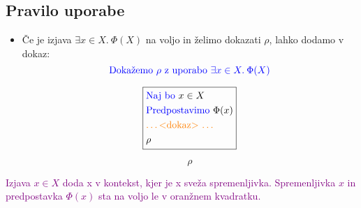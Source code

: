 \documentclass[12pt,a4paper]{article}
\newcommand{\blue}[1]{\textcolor{blue}{#1}}
\newcommand{\orange}[1]{\textcolor{orange}{#1}}
\newcommand{\purple}[1]{\textcolor{purple}{#1}}
\newcommand{\dokaz}{\orange{\text{\ldots <dokaz> \ldots}}}
\newcommand{\skatlica}[1]{
    \begin{equation*}
        \boxed{
        \begin{aligned}
            #1
        \end{aligned}
        }
    \end{equation*}
}
\begin{document}
    \subsection*{Pravilo uporabe}
    \begin{itemize}
        \item Če je izjava $ \exists x \in X. \: \Phi (X) $ na voljo in želimo dokazati $ \rho $, lahko dodamo v dokaz:
        $$ \blue{\text{Dokažemo } \rho \text{ z uporabo } \exists x \in X. \: \Phi (X) } $$
        \skatlica{
            &\blue{\text{Naj bo }} x \in X \\
            &\blue{\text{Predpostavimo }} \Phi ( x ) \\ 
            &\dokaz \\ 
            &\rho
        }
        $$ \rho $$
    \end{itemize}
    \purple{
        Izjava $x \in X $ doda x v kontekst, kjer je x sveža spremenljivka. 
        Spremenljivka $x$ in predpostavka $ \Phi (x) $ sta na voljo le v oranžnem kvadratku. 
    }
\end{document}
